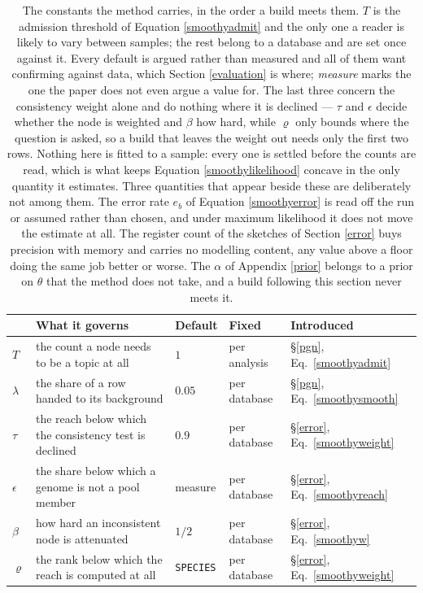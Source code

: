 \documentclass[pdflatex,sn-vancouver-num]{sn-jnl}
\begin{document}
    \begin{table}[!htbp]
        \centering
        \footnotesize
        \setlength{\tabcolsep}{4pt}
        \begin{tabular}{@{}l|l|l|l|l@{}}
            & \textbf{What it governs} & \textbf{Default} & \textbf{Fixed} & \textbf{Introduced}\\
            \hline
            $T$ & the count a node needs to be a topic at all &
                $1$ & per analysis & \S\ref{pgn}, Eq.~\eqref{smoothyadmit}\\
            $\lambda$ & the share of a row handed to its background &
                $0.05$ & per database & \S\ref{pgn}, Eq.~\eqref{smoothysmooth}\\
            $\tau$ & the reach below which the consistency test is declined &
                $0.9$ & per database & \S\ref{error}, Eq.~\eqref{smoothyweight}\\
            $\epsilon$ & the share below which a genome is not a pool member &
                measure & per database & \S\ref{error}, Eq.~\eqref{smoothyreach}\\
            $\beta$ & how hard an inconsistent node is attenuated &
                $1/2$ & per database & \S\ref{error}, Eq.~\eqref{smoothyw}\\
            $\varrho$ & the rank below which the reach is computed at all &
                \texttt{SPECIES} & per database & \S\ref{error}, Eq.~\eqref{smoothyweight}\\
        \end{tabular}
        \caption{The constants the method carries, in the order a build meets them. $T$ is the
        admission threshold of Equation \eqref{smoothyadmit} and the only one a reader is likely to
        vary between samples; the rest belong to a database and are set once against it.
        Every default is argued rather than measured and all of them want confirming against data,
        which Section \ref{evaluation} is where; \emph{measure} marks the one the paper does not even
        argue a value for. The last three concern the consistency weight
        alone and do nothing where it is declined --- $\tau$ and $\epsilon$ decide whether the node
        is weighted and $\beta$ how hard, while $\varrho$ only bounds where the question is asked, so
        a build that leaves the weight out needs only the first two rows. Nothing here is fitted to a sample: every one is settled before the counts
        are read, which is what keeps Equation \eqref{smoothylikelihood} concave in the only quantity
        it estimates. Three quantities that appear beside these are deliberately not among them. The
        error rate $e_b$ of Equation \eqref{smoothyerror} is read off the run or assumed rather than
        chosen, and under maximum likelihood it does not move the estimate at all. The register count
        of the sketches of Section \ref{error} buys precision with memory and carries no modelling
        content, any value above a floor doing the same job better or worse. The $\alpha$ of
        Appendix \ref{prior} belongs to a prior on $\theta$ that the method does not take, and a
        build following this section never meets it.}\label{constants}
    \end{table}
\end{document}
